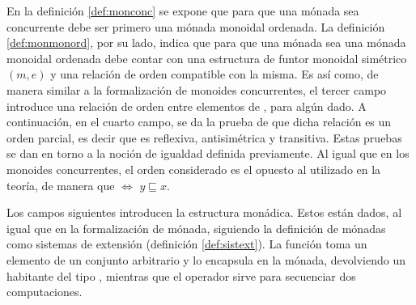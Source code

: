 En la definición \ref{def:monconc} se expone que para que una mónada sea concurrente debe ser primero una mónada monoidal ordenada. La definición \ref{def:monmonord}, por su lado, indica que para que una mónada sea una mónada monoidal ordenada debe contar con una estructura de funtor monoidal simétrico $(m,e)$ y una relación de orden compatible con la misma. Es así como, de manera similar a la formalización de monoides concurrentes, el tercer campo introduce una relación de orden entre elementos de , para algún  dado. A continuación, en el cuarto campo, se da la prueba de que dicha relación es un orden parcial, es decir que es reflexiva, antisimétrica y transitiva. Estas pruebas se dan en torno a la noción de igualdad definida previamente. Al igual que en los monoides concurrentes, el orden considerado es el opuesto al utilizado en la teoría, de manera que    $\Leftrightarrow$ $y \sqsubseteq x$. 

Los campos siguientes introducen la estructura monádica. Estos están dados, al igual que en la formalización de mónada, siguiendo la definición de mónadas como sistemas de extensión (definición \ref{def:sistext}). La función  toma un elemento de un conjunto  arbitrario y lo encapsula en la mónada, devolviendo un habitante del tipo , mientras que el operador \AgdaField{$\gg=$} sirve para secuenciar dos computaciones. 

